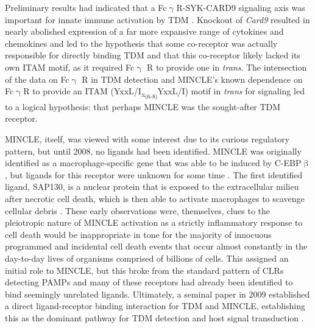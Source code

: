 Preliminary results had indicated that a Fc$\upgamma$R\hyp{}SYK\hyp{}CARD9 signaling axis was important for innate immune activation by TDM \citep{Werninghaus2009}. Knockout of \textit{Card9} resulted in nearly abolished expression of a far more expansive range of cytokines and chemokines and led to the hypothesis that some co\hyp{}receptor was actually responsible for directly binding TDM and that this co\hyp{}receptor likely lacked its own ITAM motif, as it required Fc$\upgamma$ R to provide one in \textit{trans}. The intersection of the data on Fc$\upgamma$ R in TDM detection \citep{Werninghaus2009} and MINCLE's known dependence on Fc$\upgamma$R to provide an ITAM (YxxL/I\textsubscript{x\textsubscript{(6\hyp{}8)}}YxxL/I) motif in \textit{trans} for signaling \citep{Yamasaki2008} led to a logical hypothesis: that perhaps MINCLE was the sought\hyp{}after TDM receptor.

MINCLE, itself, was viewed with some interest due to its curious regulatory pattern, but until 2008, no ligands had been identified. MINCLE was originally identified as a macrophage-specific gene that was able to be induced by C-EBP$\upbeta$, but ligands for this receptor were unknown for some time \citep{Balch1998, Akira1990}. The first identified ligand, SAP130, is a nuclear protein that is exposed to the extracellular milieu after necrotic cell death, which is then able to activate macrophages to scavenge cellular debris \citep{Yamasaki2008}. These early observations were, themselves, clues to the pleiotropic nature of MINCLE activation as a strictly inflammatory response to cell death would be inappropriate in tone for the majority of innocuous programmed and incidental cell death events that occur almost constantly in the day\hyp{}to\hyp{}day lives of organisms comprised of billions of cells. This assigned an initial role to MINCLE, but this broke from the standard pattern of CLRs detecting PAMPs and many of these receptors had already been identified to bind seemingly unrelated ligands. Ultimately, a seminal paper in 2009 established a direct ligand\hyp{}receptor binding interaction for TDM and MINCLE, establishing this as the dominant pathway for TDM detection and host signal transduction \citep{Ishikawa2009}. 

